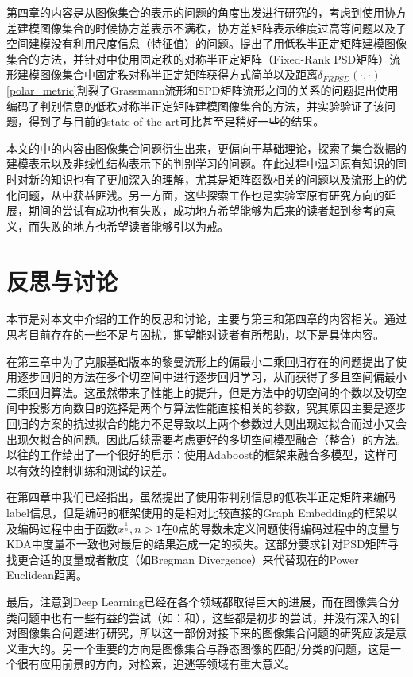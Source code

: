 第四章的内容是从图像集合的表示的问题的角度出发进行研究的，考虑到使用协方差建模图像集合的时候协方差表示不满秩，协方差矩阵表示维度过高等问题以及子空间建模没有利用尺度信息（特征值）的问题。提出了用低秩半正定矩阵建模图像集合的方法，并针对\cite{PSD_WACV}中使用固定秩的对称半正定矩阵（Fixed-Rank PSD矩阵）流形建模图像集合中固定秩对称半正定矩阵获得方式简单以及距离$\delta_{FRPSD}(\cdot,\cdot)$\ref{polar_metric}割裂了Grassmann流形和SPD矩阵流形之间的关系的问题提出使用编码了判别信息的低秩对称半正定矩阵建模图像集合的方法，并实验验证了该问题，得到了与目前的state-of-the-art可比甚至是稍好一些的结果。

本文的中的内容由图像集合问题衍生出来，更偏向于基础理论，探索了集合数据的建模表示以及非线性结构表示下的判别学习的问题。在此过程中温习原有知识的同时对新的知识也有了更加深入的理解，尤其是矩阵函数相关的问题以及流形上的优化问题，从中获益匪浅。另一方面，这些探索工作也是实验室原有研究方向的延展，期间的尝试有成功也有失败，成功地方希望能够为后来的读者起到参考的意义，而失败的地方也希望读者能够引以为戒。
\section{反思与讨论}
\label{sec:discuss}
本节是对本文中介绍的工作的反思和讨论，主要与第三和第四章的内容相关。通过思考目前存在的一些不足与困扰，期望能对读者有所帮助，以下是具体内容。

在第三章中为了克服基础版本的黎曼流形上的偏最小二乘回归存在的问题提出了使用逐步回归的方法在多个切空间中进行逐步回归学习，从而获得了多且空间偏最小二乘回归算法。这虽然带来了性能上的提升，但是方法中的切空间的个数以及切空间中投影方向数目的选择是两个与算法性能直接相关的参数，究其原因主要是逐步回归的方案的抗过拟合的能力不足导致以上两个参数过大则出现过拟合而过小又会出现欠拟合的问题。因此后续需要考虑更好的多切空间模型融合（整合）的方法。以往的工作\cite{RegionCov_pedestrain}给出了一个很好的启示：使用Adaboost的框架来融合多模型，这样可以有效的控制训练和测试的误差。

在第四章中我们已经指出，虽然提出了使用带判别信息的低秩半正定矩阵来编码label信息，但是编码的框架使用的是相对比较直接的Graph Embedding的框架以及编码过程中由于函数$x^{\frac{1}{n}},n>1$在0点的导数未定义问题使得编码过程中的度量与KDA中度量不一致也对最后的结果造成一定的损失。这部分要求针对PSD矩阵寻找更合适的度量或者散度（如Bregman Divergence）来代替现在的Power Euclidean距离。

最后，注意到Deep Learning已经在各个领域都取得巨大的进展，而在图像集合分类问题中也有一些有益的尝试（如：\cite{Deeplearning_DRM}和\cite{Deeplearning_MMDML}），这些都是初步的尝试，并没有深入的针对图像集合问题进行研究，所以这一部份对接下来的图像集合问题的研究应该是意义重大的。另一个重要的方向是图像集合与静态图像的匹配/分类的问题，这是一个很有应用前景的方向，对检索，追逃等领域有重大意义。